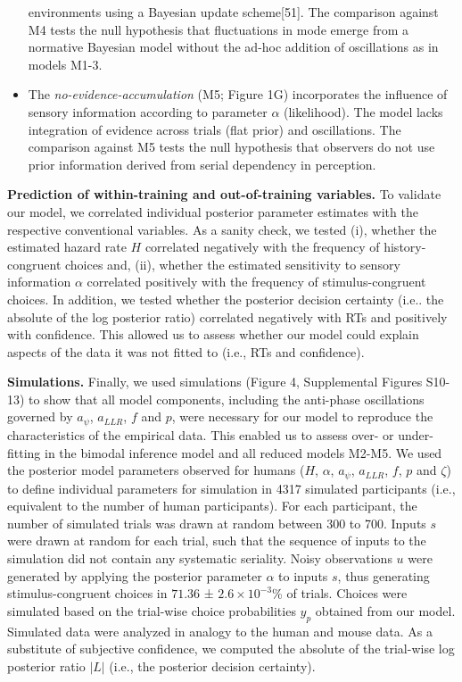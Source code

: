 \documentclass[
]{article}
\begin{document}
\begin{itemize}
  environments using a Bayesian update scheme{[}51{]}. The comparison
  against M4 tests the null hypothesis that fluctuations in mode emerge
  from a normative Bayesian model without the ad-hoc addition of
  oscillations as in models M1-3.
\item
  The \emph{no-evidence-accumulation} (M5; Figure 1G) incorporates the
  influence of sensory information according to parameter \(\alpha\)
  (likelihood). The model lacks integration of evidence across trials
  (flat prior) and oscillations. The comparison against M5 tests the
  null hypothesis that observers do not use prior information derived
  from serial dependency in perception.
\end{itemize}

\textbf{Prediction of within-training and out-of-training variables.} To
validate our model, we correlated individual posterior parameter
estimates with the respective conventional variables. As a sanity check,
we tested (i), whether the estimated hazard rate \(H\) correlated
negatively with the frequency of history-congruent choices and, (ii),
whether the estimated sensitivity to sensory information \(\alpha\)
correlated positively with the frequency of stimulus-congruent choices.
In addition, we tested whether the posterior decision certainty (i.e..
the absolute of the log posterior ratio) correlated negatively with RTs
and positively with confidence. This allowed us to assess whether our
model could explain aspects of the data it was not fitted to (i.e., RTs
and confidence).

\textbf{Simulations.} Finally, we used simulations (Figure 4,
Supplemental Figures S10-13) to show that all model components,
including the anti-phase oscillations governed by \(a_{\psi}\),
\(a_{LLR}\), \(f\) and \(p\), were necessary for our model to reproduce
the characteristics of the empirical data. This enabled us to assess
over- or under-fitting in the bimodal inference model and all reduced
models M2-M5. We used the posterior model parameters observed for humans
(\(H\), \(\alpha\), \(a_{\psi}\), \(a_{LLR}\), \(f\), \(p\) and
\(\zeta\)) to define individual parameters for simulation in 4317
simulated participants (i.e., equivalent to the number of human
participants). For each participant, the number of simulated trials was
drawn at random between 300 to 700. Inputs \(s\) were drawn at random
for each trial, such that the sequence of inputs to the simulation did
not contain any systematic seriality. Noisy observations \(u\) were
generated by applying the posterior parameter \(\alpha\) to inputs
\(s\), thus generating stimulus-congruent choices in \(71.36\) ±
\(\ensuremath{2.6\times 10^{-3}}\)\% of trials. Choices were simulated
based on the trial-wise choice probabilities \(y_{p}\) obtained from our
model. Simulated data were analyzed in analogy to the human and mouse
data. As a substitute of subjective confidence, we computed the absolute
of the trial-wise log posterior ratio \(|L|\) (i.e., the posterior
decision certainty).
\end{document}
